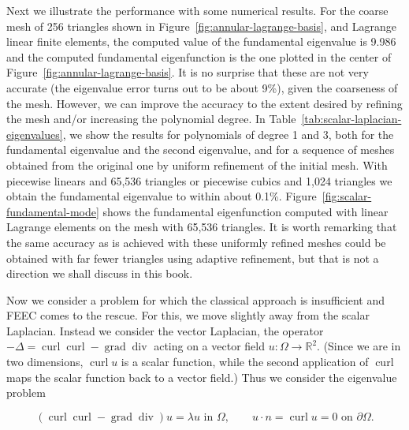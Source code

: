 {Next we illustrate the performance with some numerical results. For the coarse mesh of 256 triangles shown in Figure~\ref{fig:annular-lagrange-basis}, and Lagrange linear finite elements, the computed value of the fundamental eigenvalue is 9.986 and the computed fundamental eigenfunction is the one plotted in the center of Figure~\ref{fig:annular-lagrange-basis}. It is no surprise that these are not very accurate (the eigenvalue error turns out to be about 9\%), given the coarseness of the mesh. However, we can improve the accuracy to the extent desired by refining the mesh and/or increasing the polynomial degree. In Table~\ref{tab:scalar-laplacian-eigenvalues}, we show the results for polynomials of degree 1 and 3, both for the fundamental eigenvalue and the second eigenvalue, and for a sequence of meshes obtained from the original one by uniform refinement of the initial mesh. With piecewise linears and 65,536 triangles or piecewise cubics and 1,024 triangles we obtain the fundamental eigenvalue to within about 0.1\%. Figure~\ref{fig:scalar-fundamental-mode} shows the fundamental eigenfunction computed with linear Lagrange elements on the mesh with 65,536 triangles. It is worth remarking that the same accuracy as is achieved with these uniformly refined meshes could be obtained with far fewer triangles using adaptive refinement, but that is not a direction we shall discuss in this book.}

{Now we consider a problem for which the classical approach is insufficient and FEEC comes to the rescue. For this, we move slightly away from the scalar Laplacian. Instead we consider the vector Laplacian, the operator $-\Delta=\operatorname{curl}\operatorname{curl}-\operatorname{grad}\operatorname{div}$ acting on a vector field $u:\Omega\to\mathbb R^2$. (Since we are in two dimensions, $\operatorname{curl}u$ is a scalar function, while the second application of $\operatorname{curl}$ maps the scalar function back to a vector field.) Thus we consider the eigenvalue problem}

\begin{equation}\label{eq:vector-laplacian-eigenproblem}
(\operatorname{curl}\operatorname{curl}-\operatorname{grad}\operatorname{div})u=\lambda u\text{{ in }}\Omega,\qquad u\cdot n=\operatorname{curl}u=0\text{{ on }}\partial\Omega.
\end{equation}

